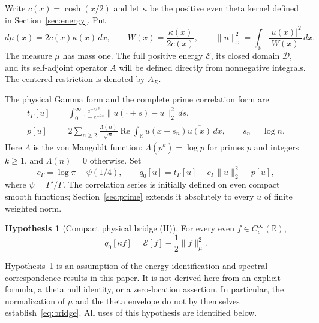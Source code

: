 \documentclass[11pt,a4paper]{article}
\numberwithin{equation}{section}
\theoremstyle{definition}
\newtheorem{hypothesis}[theorem]{Hypothesis}
\theoremstyle{remark}
\newcommand{\R}{\mathbb R}
\newcommand{\E}{\mathcal E}
\newcommand{\D}{\mathcal D}
\newcommand{\tg}{t_{\Gamma}}
\newcommand{\cg}{c_{\Gamma}}
\newcommand{\norm}[1]{\lVert #1\rVert}
\begin{document}
Write $c(x)=\cosh(x/2)$ and let $\kappa$ be the positive even theta kernel defined in Section~\ref{sec:energy}. Put
\begin{equation}\label{eq:weights}
 d\mu(x)=2c(x)\kappa(x)\,dx,\qquad
 W(x)=\frac{\kappa(x)}{2c(x)},\qquad
 \norm{u}_\omega^2=\int_\R\frac{|u(x)|^2}{W(x)}\,dx.
\end{equation}
The measure $\mu$ has mass one. The full positive energy $\E$, its closed domain $\D$, and its self-adjoint operator $A$ will be defined directly from nonnegative integrals. The centered restriction is denoted by $A_E$.

The physical Gamma form and the complete prime correlation form are
\begin{align}
 \tg[u]&=\int_0^\infty\frac{e^{-s/2}}{1-e^{-2s}}
                \norm{u(\cdot+s)-u}_2^2\,ds,\label{eq:physicalgamma}\\
 p[u]&=2\sum_{n\ge2}\frac{\Lambda(n)}{\sqrt n}
             \operatorname{Re}\int_\R u(x+s_n)\overline{u(x)}\,dx,
       \qquad s_n=\log n.\label{eq:physicalprime}
\end{align}
Here $\Lambda$ is the von Mangoldt function: $\Lambda(p^k)=\log p$ for primes $p$ and integers $k\ge1$, and $\Lambda(n)=0$ otherwise. Set
\begin{equation}\label{eq:qzero}
 \cg=\log\pi-\psi(1/4),\qquad
 q_0[u]=\tg[u]-\cg\norm{u}_2^2-p[u],
\end{equation}
where $\psi=\Gamma'/\Gamma$. The correlation series is initially defined on even compact smooth functions; Section~\ref{sec:prime} extends it absolutely to every $u$ of finite weighted norm.

\begin{hypothesis}[Compact physical bridge {\rm(H)}]\label{hyp:bridge}
For every even $f\in C_c^\infty(\R)$,
\begin{equation}\tag{H}\label{eq:bridge}
 q_0[\kappa f]=\E[f]-\frac12\norm{f}_\mu^2.
\end{equation}
\end{hypothesis}

Hypothesis~\ref{hyp:bridge} is an assumption of the energy-identification and spectral-correspondence results in this paper. It is not derived here from an explicit formula, a theta null identity, or a zero-location assertion. In particular, the normalization of $\mu$ and the theta envelope do not by themselves establish~\eqref{eq:bridge}. All uses of this hypothesis are identified below.
\end{document}

